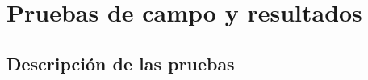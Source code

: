 \chapter{Pruebas de campo y resultados}\label{cha:pruebas}
\section{Descripción de las pruebas}




	
